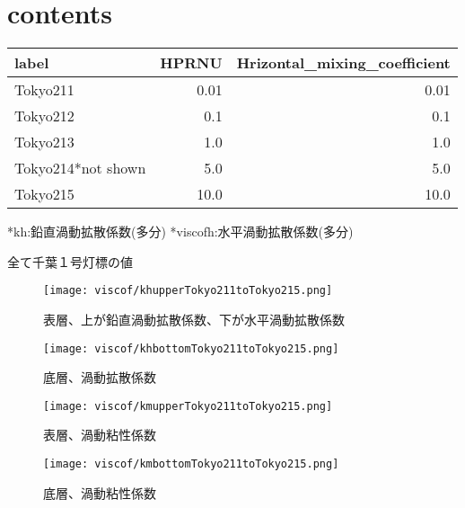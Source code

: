 \documentclass[fontsize=12pt,paper=a4]{jlreq}
\begin{document}
\section{contents}
\begin{center}
    \begin{tabular}{lrr} \toprule
   label & HPRNU & Hrizontal\_mixing\_coefficient \\ \midrule
   Tokyo211 & 0.01 & 0.01 \\
   Tokyo212 & 0.1 & 0.1 \\
   Tokyo213 & 1.0 & 1.0 \\
   Tokyo214*not shown & 5.0 & 5.0 \\
   Tokyo215 & 10.0 & 10.0 \\ \bottomrule
  \end{tabular}
\end{center}
*kh:鉛直渦動拡散係数(多分)  *viscofh:水平渦動拡散係数(多分)
  
全て千葉１号灯標の値
\begin{figure}[hbtp]
   \centering
   \texttt{[image: viscof/khupperTokyo211toTokyo215.png]}
   \caption{表層、上が鉛直渦動拡散係数、下が水平渦動拡散係数}
\end{figure}
\begin{figure}[hbtp]
    \centering
    \texttt{[image: viscof/khbottomTokyo211toTokyo215.png]}
    \caption{底層、渦動拡散係数}
 \end{figure}

 \begin{figure}[hbtp]
    \centering
    \texttt{[image: viscof/kmupperTokyo211toTokyo215.png]}
    \caption{表層、渦動粘性係数}
 \end{figure}

 \begin{figure}[hbtp]
    \centering
    \texttt{[image: viscof/kmbottomTokyo211toTokyo215.png]}
    \caption{底層、渦動粘性係数}
 \end{figure}
 
\end{document}
